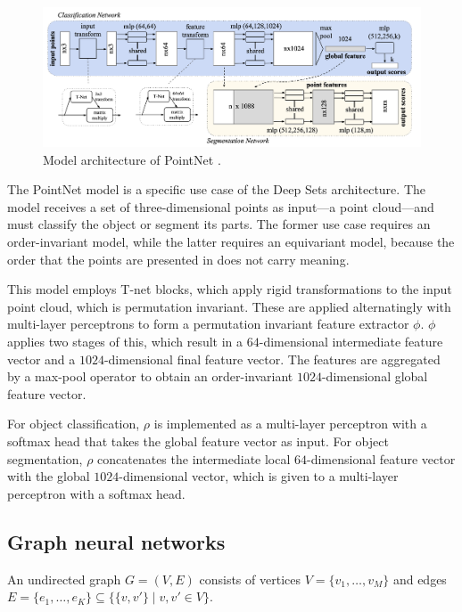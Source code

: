 \begin{figure}[t]
    \includegraphics[width=\textwidth]{figures/pointnet}
    \caption{Model architecture of PointNet \citep{qi2017pointnet}.}
    \label{fig:pointnet}
\end{figure}

The PointNet model \citep{qi2017pointnet} is a specific use case of the Deep Sets architecture. The
model receives a set of three-dimensional points as input---a point cloud---and must classify the
object or segment its parts. The former use case requires an order-invariant model, while the
latter requires an equivariant model, because the order that the points are presented in does not
carry meaning.

This model employs T-net blocks, which apply rigid transformations to the input point cloud, which
is permutation invariant. These are applied alternatingly with multi-layer perceptrons to form a
permutation invariant feature extractor $\phi$. $\phi$ applies two stages of this, which result in
a $64$-dimensional intermediate feature vector and a $1024$-dimensional final feature vector. The
features are aggregated by a max-pool operator to obtain an order-invariant $1024$-dimensional
global feature vector.

For object classification, $\rho$ is implemented as a multi-layer perceptron with a softmax head
that takes the global feature vector as input. For object segmentation, $\rho$ concatenates the
intermediate local $64$-dimensional feature vector with the global $1024$-dimensional vector, which
is given to a multi-layer perceptron with a softmax head.

\subsection{Graph neural networks}

\begin{definition}[Graph]
    An undirected graph $G=(V, E)$ consists of vertices $V = \{ v_1, \ldots, v_M \}$ and edges $E = \{ e_1, \ldots, e_K \} \subseteq \{ \{ v, v' \} \mid v, v' \in V \}$.
\end{definition}


